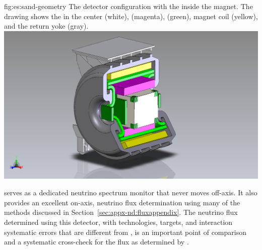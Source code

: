 \begin{dunefigure}{fig:es:sand-geometry}
{The  detector configuration with the  inside the  magnet. The drawing shows the  in the center (white),  (magenta),  (green), magnet coil (yellow), and the return yoke (gray).}
  \includegraphics[width=7.in]{graphics/3DST-KLOE2019-08-01.png}
\end{dunefigure}

 serves as a dedicated neutrino spectrum monitor that never moves off-axis. %
It also provides an excellent on-axis, neutrino flux determination using many of the methods discussed in Section~\ref{sec:appx-nd:fluxappendix}. 
The neutrino flux determined using this detector, with  %
technologies, targets, and interaction systematic errors that are different from , is an important point of comparison and a systematic cross-check for the flux as determined by .



